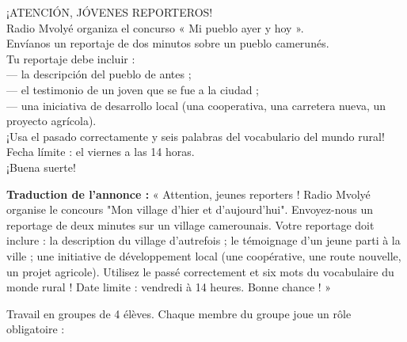 \documentclass[11pt]{article}
\newcommand{\cle}[1]{{\popxbold\color{popdark}#1}}
\newcounter{popsec}
\newcounter{popsub}
\newcommand{\courssub}[1]{%
  \stepcounter{popsub}%
  \par\vspace{9pt}\noindent{\popxbold\fontsize{11.5}{13}\selectfont\color{popink}{\color{poporange}\thepopsec.\thepopsub}\hspace{6pt}#1}\par\nopagebreak\vspace{4pt}
}
\begin{document}
\begin{textebox}
¡ATENCIÓN, JÓVENES REPORTEROS!\\
Radio Mvolyé organiza el concurso « Mi pueblo ayer y hoy ».\\
Envíanos un reportaje de dos minutos sobre un pueblo camerunés.\\
Tu reportaje debe incluir :\\
— la descripción del pueblo de antes ;\\
— el testimonio de un joven que se fue a la ciudad ;\\
— una iniciativa de desarrollo local (una cooperativa, una carretera nueva, un proyecto agrícola).\\
¡Usa el pasado correctamente y seis palabras del vocabulario del mundo rural!\\
Fecha límite : el viernes a las 14 horas.\\
¡Buena suerte!
\end{textebox}

\textbf{Traduction de l'annonce :} « Attention, jeunes reporters ! Radio Mvolyé organise le concours "Mon village d'hier et d'aujourd'hui". Envoyez-nous un reportage de deux minutes sur un village camerounais. Votre reportage doit inclure : la description du village d'autrefois ; le témoignage d'un jeune parti à la ville ; une initiative de développement local (une coopérative, une route nouvelle, un projet agricole). Utilisez le passé correctement et six mots du vocabulaire du monde rural ! Date limite : vendredi à 14 heures. Bonne chance ! »

\courssub{Consignes}

Travail en \cle{groupes de 4 élèves}. Chaque membre du groupe joue un rôle obligatoire :
\end{document}
